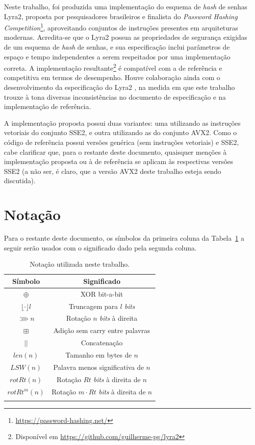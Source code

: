 \documentclass{article}
\begin{document}
Neste trabalho, foi produzida uma implementação do
esquema de \emph{hash} de senhas Lyra2, proposta por pesquisadores
brasileiros e finalista do \emph{Password Hashing Competition}\footnote{\url{https://password-hashing.net/}}, aproveitando
conjuntos de instruções presentes em arquiteturas modernas. Acredita-se
que o Lyra2 possua as propriedades de segurança exigidas de um esquema
de \emph{hash} de senhas, e sua especificação inclui parâmetros de espaço e tempo
independentes a serem respeitados por uma implementação correta.
A implementação resultante\footnote{Disponível em \url{https://github.com/guilherme-pg/lyra2}}
é compatível com a de referência e competitiva em termos de desempenho. Houve colaboração
ainda com o desenvolvimento da especificação do Lyra2 \cite{lyra2-spec},
na medida em que este trabalho trouxe à tona diversas
inconsistências no documento de especificação e na implementação de referência.

A implementação proposta possui duas variantes: uma utilizando as instruções
vetoriais do conjunto SSE2, e outra utilizando as do conjunto AVX2. Como o
código de referência possui versões genérica (sem instruções vetoriais) e SSE2,
cabe clarificar que, para o restante deste documento, quaisquer menções à
implementação proposta ou à de referência se aplicam às respectivas versões
SSE2 (a não ser, é claro, que a versão AVX2 deste trabalho esteja sendo
discutida).

\section{Notação}

Para o restante deste documento, os símbolos da primeira coluna da
Tabela~\ref{tb:notation} a seguir serão usados com o significado dado pela segunda coluna.

\begin{longtable}[c]{@{}cc@{}}
\toprule
Símbolo & Significado\tabularnewline
\midrule
\endhead
$\oplus$ & XOR bit-a-bit\tabularnewline
$\lfloor \cdot \rfloor l$ & Truncagem para $l$ \emph{bits}\tabularnewline
$\ggg n$ & Rotação $n$ \emph{bits} à direita\tabularnewline
$\boxplus$ & Adição sem carry entre palavras\tabularnewline
$||$ & Concatenação\tabularnewline
$len(n)$ & Tamanho em bytes de $n$\tabularnewline
$LSW(n)$ & Palavra menos significativa de $n$\tabularnewline
$rotRt(n)$ & Rotação $Rt$ \emph{bits} à direita de $n$\tabularnewline
$rotRt^{m}(n)$ & Rotação $m \cdot Rt$ \emph{bits} à direita de
$n$\tabularnewline
\bottomrule
\caption{\label{tb:notation} Notação utilizada neste trabalho.}
\end{longtable}
\vspace{-1cm}
\end{document}
